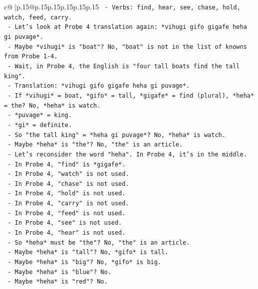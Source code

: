 \documentclass{article}
\begin{document}
{\begin{supertabular}{c@{$\;$}|p{.15\linewidth}@{}p{.15\linewidth}p{.15\linewidth}p{.15\linewidth}p{.15\linewidth}p{.15\linewidth}}
{{{\texttt{          {-} Verbs: find, hear, see, chase, hold, watch, feed, carry.} \\
\texttt{          {-} Let's look at Probe 4 translation again: *vihugi gifo gigafe heha gi puvage*.} \\
\texttt{          {-} Maybe *vihugi* is "boat"? No, "boat" is not in the list of knowns from Probe 1{-}4.} \\
\texttt{          {-} Wait, in Probe 4, the English is "four tall boats find the tall king".} \\
\texttt{          {-} Translation: *vihugi gifo gigafe heha gi puvage*.} \\
\texttt{          {-} If *vihugi* = boat, *gifo* = tall, *gigafe* = find (plural), *heha* = the? No, *heha* is watch.} \\
\texttt{          {-} *puvage* = king.} \\
\texttt{          {-} *gi* = definite.} \\
\texttt{          {-} So "the tall king" = *heha gi puvage*? No, *heha* is watch.} \\
\texttt{          {-} Maybe *heha* is "the"? No, "the" is an article.} \\
\texttt{          {-} Let's reconsider the word "heha". In Probe 4, it's in the middle.} \\
\texttt{          {-} In Probe 4, "find" is *gigafe*.} \\
\texttt{          {-} In Probe 4, "watch" is not used.} \\
\texttt{          {-} In Probe 4, "chase" is not used.} \\
\texttt{          {-} In Probe 4, "hold" is not used.} \\
\texttt{          {-} In Probe 4, "carry" is not used.} \\
\texttt{          {-} In Probe 4, "feed" is not used.} \\
\texttt{          {-} In Probe 4, "see" is not used.} \\
\texttt{          {-} In Probe 4, "hear" is not used.} \\
\texttt{          {-} So *heha* must be "the"? No, "the" is an article.} \\
\texttt{          {-} Maybe *heha* is "tall"? No, *gifo* is tall.} \\
\texttt{          {-} Maybe *heha* is "big"? No, *gifo* is big.} \\
\texttt{          {-} Maybe *heha* is "blue"? No.} \\
\texttt{          {-} Maybe *heha* is "red"? No.} \\
}}}
\end{supertabular}}
\end{document}
